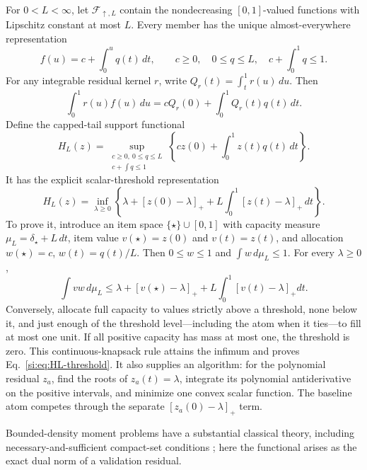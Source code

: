 \documentclass[10pt,twocolumn]{article}
\newcommand{\cF}{\mathcal F}
\begin{document}
For $0<L<\infty$, let $\cF_{\uparrow,L}$ contain the nondecreasing $[0,1]$-valued functions with Lipschitz constant at most $L$. Every member has the unique almost-everywhere representation
\begin{equation}
f(u)=c+\int_0^u q(t)\,dt,\qquad
c\ge0,\quad0\le q\le L,\quad c+\int_0^1q\le1.
\label{si:eq:lipschitz-representation}
\end{equation}
For any integrable residual kernel $r$, write $Q_r(t)=\int_t^1r(u)\,du$. Then
\begin{equation}
\int_0^1r(u)f(u)\,du
=cQ_r(0)+\int_0^1Q_r(t)q(t)\,dt.
\label{si:eq:tail-pairing}
\end{equation}
Define the capped-tail support functional
\begin{equation}
H_L(z)=\sup_{\substack{c\ge0,\ 0\le q\le L\\c+\int q\le1}}
\left\{cz(0)+\int_0^1z(t)q(t)\,dt\right\}.
\label{si:eq:HL}
\end{equation}
It has the explicit scalar-threshold representation
\begin{equation}
\boxed{H_L(z)=\inf_{\lambda\ge0}
\left\{\lambda+[z(0)-\lambda]_+
+L\int_0^1[z(t)-\lambda]_+\,dt\right\}.}
\label{si:eq:HL-threshold}
\end{equation}
To prove it, introduce an item space $\{\star\}\cup[0,1]$ with capacity
measure $\mu_L=\delta_\star+L\,dt$, item value $v(\star)=z(0)$ and
$v(t)=z(t)$, and allocation $w(\star)=c$, $w(t)=q(t)/L$. Then
$0\le w\le1$ and $\int w\,d\mu_L\le1$. For every $\lambda\ge0$,
\begin{equation*}
\int vw\,d\mu_L
\le \lambda+[v(\star)-\lambda]_+
+L\int_0^1[v(t)-\lambda]_+dt.
\end{equation*}
Conversely, allocate full capacity to values strictly above a threshold, none
below it, and just enough of the threshold level---including the atom when it
ties---to fill at most one unit. If all positive capacity has mass at most one,
the threshold is zero. This continuous-knapsack rule attains the infimum and
proves Eq.~\ref{si:eq:HL-threshold}. It also supplies an algorithm: for the
polynomial residual $z_a$, find the roots of $z_a(t)=\lambda$, integrate its
polynomial antiderivative on the positive intervals, and minimize one convex
scalar function. The baseline atom competes through the separate
$[z_a(0)-\lambda]_+$ term.

Bounded-density moment problems have a substantial classical theory, including necessary-and-sufficient compact-set conditions \citep[Theorem~3(a--c), pp.~5--6]{lasserre2006}; here the functional arises as the exact dual norm of a validation residual.
\end{document}
